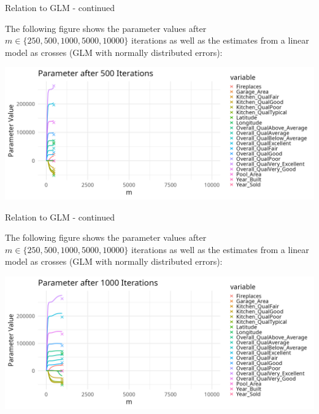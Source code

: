 \begin{vbframe}{Relation to GLM - continued}

The following figure shows the parameter values after $m \in \{250, 500, 1000, 5000, 10000\}$ iterations as well as the estimates from a linear model as crosses (GLM with normally distributed errors):

\begin{center}
\includegraphics[width=\textwidth]{figure/compboost-to-glm-iter500.png}
\end{center}

\end{vbframe}

\begin{vbframe}{Relation to GLM - continued}

The following figure shows the parameter values after $m \in \{250, 500, 1000, 5000, 10000\}$ iterations as well as the estimates from a linear model as crosses (GLM with normally distributed errors):

\begin{center}
\includegraphics[width=\textwidth]{figure/compboost-to-glm-iter1000.png}
\end{center}

\end{vbframe}

